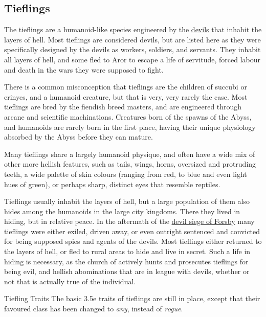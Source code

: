 \subsection{Tieflings}
\label{sec:Tieflings}

The tieflings are a humanoid-like species engineered by the
\hyperref[sec:Devils]{devils} that inhabit the layers of hell. Most tieflings
are considered devils, but are listed here as they were specifically designed
by the devils as workers, soldiers, and servants. They inhabit all layers of
hell, and some fled to Aror to escape a life of servitude, forced labour and
death in the wars they were supposed to fight.

There is a common misconception that tieflings are the children of succubi or
erinyes, and a humanoid creature, but that is very, very rarely the case. Most
tieflings are bred by the fiendish breed masters, and are engineered through
arcane and scientific machinations. Creatures born of the spawns of the Abyss,
and humanoids are rarely born in the first place, having their unique
physiology absorbed by the Abyss before they can mature.

Many tieflings share a largely humanoid physique, and often have a wide mix of
other more hellish features, such as tails, wings, horns, oversized and
protruding teeth, a wide palette of skin colours (ranging from red, to blue
and even light hues of green), or perhaps sharp, distinct eyes that resemble
reptiles.

Tieflings usually inhabit the layers of hell, but a large population of them
also hides among the humanoids in the large city kingdoms. There they lived
in hiding, but in relative peace. In the aftermath of the \hyperref[sec:Devil
  Siege]{devil siege of Forsby} many tieflings were either exiled, driven
away, or even outright sentenced and convicted for being supposed spies and
agents of the devils. Most tieflings either returned to the layers of hell, or
fled to rural areas to hide and live in secret. Such a life in hiding is
necessary, as the church of  actively hunts and prosecutes
tieflings for being evil, and hellish abominations that are in league with
devils, whether or not that is actually true of the individual.

\begin{35e}{Tiefling Traits}
  The basic 3.5e traits of tieflings are still in place, except that their
  favoured class has been changed to \emph{any}, instead of \emph{rogue}.
\end{35e}

